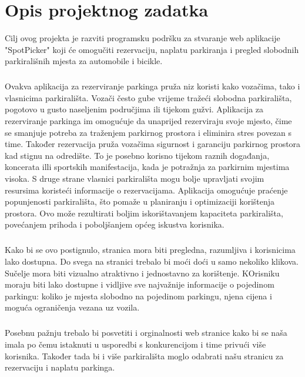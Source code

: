 \chapter{Opis projektnog zadatka}


{Cilj ovog projekta je razviti programsku podršku za stvaranje web aplikacije "SpotPicker" koji će omogučiti rezervaciju, naplatu parkiranja i pregled slobodnih parkirališnih mjesta za automobile i bicikle. }
\paragraph*{}{Ovakva aplikacija za rezerviranje parkinga pruža niz koristi kako vozačima, tako i vlasnicima parkirališta. Vozači često gube vrijeme tražeći slobodna parkirališta, pogotovo u gusto naseljenim područjima ili tijekom gužvi. Aplikacija za rezerviranje parkinga im omogućuje da unaprijed rezerviraju svoje mjesto, čime se smanjuje potreba za traženjem parkirnog prostora i eliminira stres povezan s time. Također rezervacija pruža vozačima sigurnost i garanciju parkirnog prostora kad stignu na odredište. To je posebno korisno tijekom raznih događanja, koncerata illi sportskih manifestacija, kada je potražnja za parkirnim mjestima visoka. S druge strane vlasnici parkirališta mogu bolje upravljati svojim resursima koristeći informacije o rezervacijama. Aplikacija omogućuje praćenje popunjenosti parkirališta, što pomaže u planiranju i optimizaciji korištenja prostora. Ovo može rezultirati boljim iskorištavanjem kapaciteta parkirališta, povećanjem prihoda i poboljšanjem općeg iskustva korisnika.}
\paragraph*{}{Kako bi se ovo postignulo, stranica mora biti pregledna, razumljiva i korisnicima lako dostupna. Do svega na stranici trebalo bi moći doći u samo nekoliko klikova. Sučelje mora biti vizualno atraktivno i jednostavno za korištenje. KOrisniku moraju biti lako dostupne i vidljive sve najvažnije informacije o pojedinom parkingu: koliko je mjesta slobodno na pojedinom parkingu, njena cijena i moguća ograničenja vezana uz vozila.}
\paragraph*{}{Posebnu pažnju trebalo bi posvetiti i orginalnosti web stranice kako bi se naša imala po čemu istaknuti u usporedbi s konkurencijom i time privući više korisnika. Također tada bi i više parkirališta moglo odabrati našu stranicu za rezervaciju i naplatu parkinga.}
